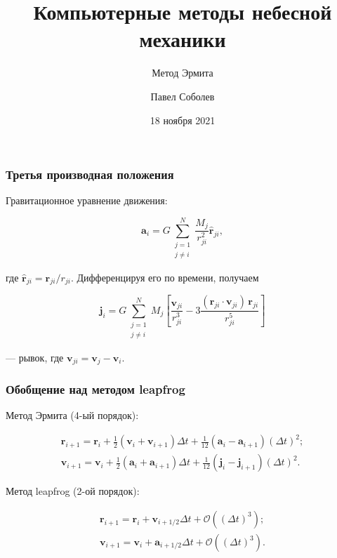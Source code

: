 


\title{Компьютерные методы небесной механики}
\subtitle{Метод Эрмита}
\author{Павел Соболев}
\date{18 ноября 2021}



\frame{\titlepage}

\begin{frame}
\frametitle{Третья производная положения}

Гравитационное уравнение движения:

\su
\begin{equation}
  \mathbf{a}_i = G \sum_{\substack{j = 1 \\ j \neq i}}^N \frac{M_j}{r_{ji}^2} \hat{\mathbf{r}}_{ji},
\end{equation}

где $ \hat{\mathbf{r}}_{ji} = \mathbf{r}_{ji} / r_{ji} $. Дифференцируя его по времени, получаем

\su
\begin{equation}
  \mathbf{j}_i = G \sum_{\substack{j = 1 \\ j \neq i}}^N M_j \left[ \frac{\mathbf{v}_{ji}}{r_{ji}^3} - 3 \frac{(\mathbf{r}_{ji} \cdot \mathbf{v}_{ji}) \, \mathbf{r}_{ji}}{r_{ji}^5} \right]
\end{equation}

--- рывок, где $ \mathbf{v}_{ji} = \mathbf{v}_j - \mathbf{v}_i $.

\end{frame}

\begin{frame}
\frametitle{Обобщение над методом leapfrog}

Метод Эрмита (4-ый порядок):

\su
\begin{equation}
\begin{gathered}
  \mathbf{r}_{i+1} = \mathbf{r}_i + \tfrac{1}{2} (\mathbf{v}_i + \mathbf{v}_{i+1}) \Delta t + \tfrac{1}{12} (\mathbf{a}_i - \mathbf{a}_{i+1}) (\Delta t)^2; \\
  \mathbf{v}_{i+1} = \mathbf{v}_i + \tfrac{1}{2} (\mathbf{a}_i + \mathbf{a}_{i+1}) \Delta t + \tfrac{1}{12} (\mathbf{j}_i - \mathbf{j}_{i+1}) (\Delta t)^2.
\end{gathered}
\end{equation}

Метод leapfrog (2-ой порядок):

\su
\begin{equation}
\begin{gathered}
  \mathbf{r}_{i+1} = \mathbf{r}_i + \mathbf{v}_{i + 1/2} \Delta t + \mathcal{O} \left( (\Delta t)^3 \right); \\
  \mathbf{v}_{i+1} = \mathbf{v}_i + \mathbf{a}_{i + 1/2} \Delta t + \mathcal{O} \left( (\Delta t)^3 \right).
\end{gathered}
\end{equation}

\end{frame}

